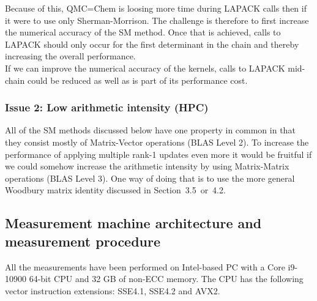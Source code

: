 \documentclass[11pt]{article}
\numberwithin{figure}{section}
\numberwithin{table}{section}
\begin{document}
      Because of this, QMC=Chem is loosing more time during LAPACK calls then if it were to use only Sherman-Morrison. The challenge is therefore to first increase the numerical accuracy of the SM method. Once that is achieved, calls to LAPACK should only occur for the first determinant in the chain and thereby increasing the overall performance.\\
      
      If we can improve the numerical accuracy of the kernels, calls to LAPACK mid-chain could be reduced as well as is part of its performance cost.
    
    \subsubsection{Issue 2: Low arithmetic intensity (HPC)}
      All of the SM methods discussed below have one property in common in that they consist mostly of Matrix-Vector operations (BLAS Level 2). To increase the performance of applying multiple rank-1 updates even more it would be fruitful if we could somehow increase the arithmetic intensity by using Matrix-Matrix operations (BLAS Level 3). One way of doing that is to use the more general Woodbury matrix identity discussed in Section~3.5~or~4.2.
				
    \subsection{Measurement machine architecture and measurement procedure}
      All the measurements have been performed on Intel-based PC with a Core i9-10900 64-bit CPU and 32 GB of non-ECC memory. The CPU has the following vector instruction extensions: SSE4.1, SSE4.2 and AVX2.\\
    
\end{document}

